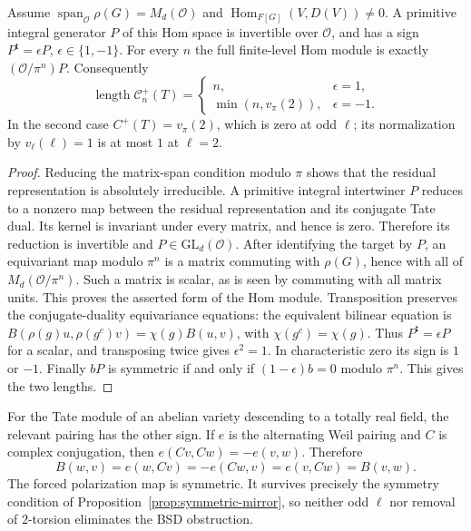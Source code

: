 \begin{proposition}
\label{prop:exact-sign}
Assume $\operatorname{span}_{\mathcal O}\rho(G)=M_d(\mathcal O)$ and
$\operatorname{Hom}_{F[G]}(V,D(V))\ne0$.  A primitive integral generator
$P$ of this Hom space is invertible over $\mathcal O$, and has a sign
$P^{\mathsf t}=\epsilon P$, $\epsilon\in\{1,-1\}$.
For every $n$ the full finite-level Hom module is exactly
$(\mathcal O/\pi^n)P$.  Consequently
\[
 \operatorname{length}\mathcal C_n^+(T)=
 \begin{cases}
  n,&\epsilon=1,\\
  \min(n,v_\pi(2)),&\epsilon=-1.
 \end{cases}
\]
In the second case $C^+(T)=v_\pi(2)$, which is zero at odd $\ell$;
its normalization by $v_\ell(\ell)=1$ is at most $1$ at $\ell=2$.
\end{proposition}
\begin{proof}
Reducing the matrix-span condition modulo $\pi$ shows that the residual
representation is absolutely irreducible.  A primitive integral
intertwiner $P$ reduces to a nonzero map between the residual
representation and its conjugate Tate dual.  Its kernel is invariant
under every matrix, and hence is zero.  Therefore its reduction is
invertible and $P\in\mathrm{GL}_d(\mathcal O)$.
After identifying the target by $P$, an equivariant map modulo $\pi^n$
is a matrix commuting with $\rho(G)$, hence with all of
$M_d(\mathcal O/\pi^n)$.  Such a matrix is scalar, as is seen by commuting
with all matrix units.  This proves the asserted form of the Hom module.
Transposition preserves the conjugate-duality equivariance equations:
the equivalent bilinear equation is
$B(\rho(g)u,\rho(g^c)v)=\chi(g)B(u,v)$, with $\chi(g^c)=\chi(g)$.
Thus $P^{\mathsf t}=\epsilon P$ for a scalar, and transposing twice gives
$\epsilon^2=1$.  In characteristic zero its sign is $1$ or $-1$.
Finally $bP$ is symmetric if and only if $(1-\epsilon)b=0$ modulo
$\pi^n$.  This gives the two lengths.
\end{proof}

For the Tate module of an abelian variety descending to a totally real
field, the relevant pairing has the other sign.  If $e$ is the
alternating Weil pairing and $C$ is complex conjugation, then
$e(Cv,Cw)=-e(v,w)$.  Therefore
\[
 B(w,v)=e(w,Cv)=-e(Cw,v)=e(v,Cw)=B(v,w).
\]
The forced polarization map is symmetric.  It survives precisely the
symmetry condition of Proposition~\ref{prop:symmetric-mirror}, so neither
odd $\ell$ nor removal of $2$-torsion eliminates the BSD obstruction.

